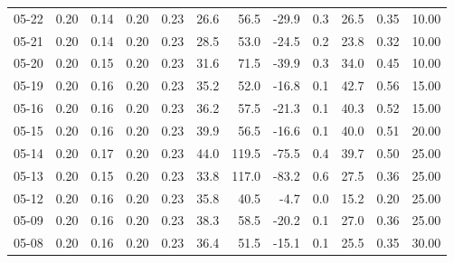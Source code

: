 \begin{threeparttable}
{\begin{tabular}{lrrrrrrrrrrr}
  05-22 &          0.20 &          0.14 &          0.20 &        0.23 &                26.6 &                56.5 &      -29.9 &                 0.3 &             26.5 &            0.35 &                  10.00 \\
  05-21 &          0.20 &          0.14 &          0.20 &        0.23 &                28.5 &                53.0 &      -24.5 &                 0.2 &             23.8 &            0.32 &                  10.00 \\
  05-20 &          0.20 &          0.15 &          0.20 &        0.23 &                31.6 &                71.5 &      -39.9 &                 0.3 &             34.0 &            0.45 &                  10.00 \\
  05-19 &          0.20 &          0.16 &          0.20 &        0.23 &                35.2 &                52.0 &      -16.8 &                 0.1 &             42.7 &            0.56 &                  15.00 \\
  05-16 &          0.20 &          0.16 &          0.20 &        0.23 &                36.2 &                57.5 &      -21.3 &                 0.1 &             40.3 &            0.52 &                  15.00 \\
  05-15 &          0.20 &          0.16 &          0.20 &        0.23 &                39.9 &                56.5 &      -16.6 &                 0.1 &             40.0 &            0.51 &                  20.00 \\
  05-14 &          0.20 &          0.17 &          0.20 &        0.23 &                44.0 &               119.5 &      -75.5 &                 0.4 &             39.7 &            0.50 &                  25.00 \\
  05-13 &          0.20 &          0.15 &          0.20 &        0.23 &                33.8 &               117.0 &      -83.2 &                 0.6 &             27.5 &            0.36 &                  25.00 \\
  05-12 &          0.20 &          0.16 &          0.20 &        0.23 &                35.8 &                40.5 &       -4.7 &                 0.0 &             15.2 &            0.20 &                  25.00 \\
  05-09 &          0.20 &          0.16 &          0.20 &        0.23 &                38.3 &                58.5 &      -20.2 &                 0.1 &             27.0 &            0.36 &                  25.00 \\
  05-08 &          0.20 &          0.16 &          0.20 &        0.23 &                36.4 &                51.5 &      -15.1 &                 0.1 &             25.5 &            0.35 &                  30.00 \\

\end{tabular}}
\end{threeparttable}
